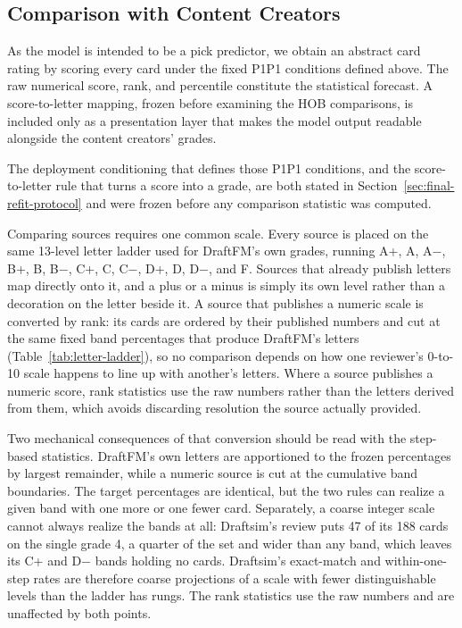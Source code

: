 \documentclass[11pt]{article}
\numberwithin{equation}{section}
\begin{document}
\subsection{Comparison with Content Creators}
\label{sec:creator-comparison}

As the model is intended to be a pick predictor, we obtain an abstract card rating by scoring every card under the fixed P1P1 conditions defined above. The raw numerical score, rank, and percentile constitute the statistical forecast. A score-to-letter mapping, frozen before examining the HOB comparisons, is included only as a presentation layer that makes the model output readable alongside the content creators' grades.

The deployment conditioning that defines those P1P1 conditions, and the
score-to-letter rule that turns a score into a grade, are both stated in
Section~\ref{sec:final-refit-protocol} and were frozen before any comparison
statistic was computed.

Comparing sources requires one common scale. Every source is placed on the same
13-level letter ladder used for DraftFM's own grades, running A+, A, A$-$, B+,
B, B$-$, C+, C, C$-$, D+, D, D$-$, and F. Sources that already publish letters
map directly onto it, and a plus or a minus is simply its own level rather than a
decoration on the letter beside it. A source that publishes a numeric scale is
converted by rank: its cards are ordered by their published numbers and cut at
the same fixed band percentages that produce DraftFM's letters
(Table~\ref{tab:letter-ladder}), so no comparison depends on how one reviewer's
0-to-10 scale happens to line up with another's letters. Where a source publishes
a numeric score, rank statistics use the raw numbers rather than the letters
derived from them, which avoids discarding resolution the source actually
provided.

Two mechanical consequences of that conversion should be read with the
step-based statistics. DraftFM's own letters are apportioned to the frozen
percentages by largest remainder, while a numeric source is cut at the
cumulative band boundaries. The target percentages are identical, but the two
rules can realize a given band with one more or one fewer card. Separately, a
coarse integer scale cannot always realize the bands at all: Draftsim's review
puts 47 of its 188 cards on the single grade 4, a quarter of the set and wider
than any band, which leaves its C+ and D$-$ bands holding no cards. Draftsim's
exact-match and within-one-step rates are therefore coarse projections of a
scale with fewer distinguishable levels than the ladder has rungs. The rank
statistics use the raw numbers and are unaffected by both points.
\end{document}
